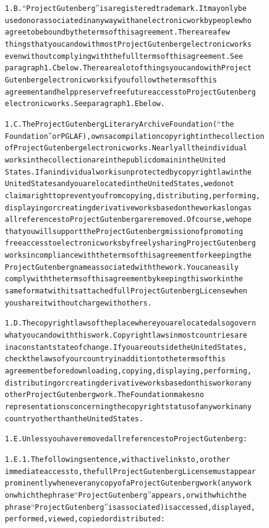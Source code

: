 \documentclass[12pt]{book}[2005/09/16]
\newenvironment{PGtext}{%
\begin{alltt}
\fontsize{9.2}{10.5}\ttfamily\selectfont}%
{\end{alltt}}
\begin{document}
\begin{PGtext}
1.B. “Project Gutenberg” is a registered trademark. It may only be
used on or associated in any way with an electronic work by people who
agree to be bound by the terms of this agreement. There are a few
things that you can do with most Project Gutenberg electronic works
even without complying with the full terms of this agreement. See
paragraph 1.C below. There are a lot of things you can do with Project
Gutenberg electronic works if you follow the terms of this
agreement and help preserve free future access to Project Gutenberg
electronic works. See paragraph 1.E below.

1.C. The Project Gutenberg Literary Archive Foundation (“the
Foundation” or PGLAF), owns a compilation copyright in the collection
of Project Gutenberg electronic works. Nearly all the individual
works in the collection are in the public domain in the United
States. If an individual work is unprotected by copyright law in the
United States and you are located in the United States, we do not
claim a right to prevent you from copying, distributing, performing,
displaying or creating derivative works based on the work as long as
all references to Project Gutenberg are removed. Of course, we hope
that you will support the Project Gutenberg mission of promoting
free access to electronic works by freely sharing Project Gutenberg
works in compliance with the terms of this agreement for keeping the
Project Gutenberg name associated with the work. You can easily
comply with the terms of this agreement by keeping this work in the
same format with its attached full Project Gutenberg License when
you share it without charge with others.

1.D. The copyright laws of the place where you are located also govern
what you can do with this work. Copyright laws in most countries are
in a constant state of change. If you are outside the United States,
check the laws of your country in addition to the terms of this
agreement before downloading, copying, displaying, performing,
distributing or creating derivative works based on this work or any
other Project Gutenberg work. The Foundation makes no
representations concerning the copyright status of any work in any
country other than the United States.

1.E. Unless you have removed all references to Project Gutenberg:

1.E.1. The following sentence, with active links to, or other
immediate access to, the full Project Gutenberg License must appear
prominently whenever any copy of a Project Gutenberg work (any work
on which the phrase “Project Gutenberg” appears, or with which the
phrase “Project Gutenberg” is associated) is accessed, displayed,
performed, viewed, copied or distributed:


\end{PGtext}
\end{document}
